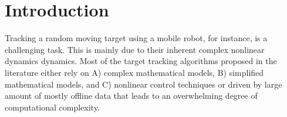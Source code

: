 \documentclass[conference]{IEEEtran}
\begin{document}
\section{Introduction}
\label{sec:introduction}

Tracking a random moving target using a mobile robot, for instance, is a challenging task. This is mainly due to their inherent complex nonlinear dynamics dynamics. Most of the target tracking algorithms proposed in the literature either rely on A) complex mathematical models, B) simplified mathematical models, and C) nonlinear control techniques or driven by large amount of mostly offline data that leads to an overwhelming degree of computational complexity.
\end{document}
